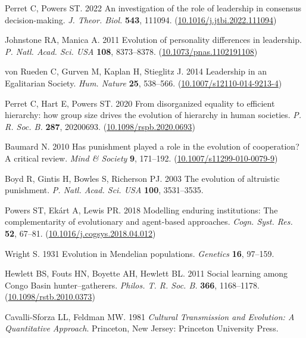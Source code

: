 \documentclass{rstb}
\begin{document}
\begin{thebibliography}{99}
Perret C, Powers ST. 2022  An investigation of the role of leadership in
  consensus decision-making. {\em J. Theor. Biol.} \textbf{543},
  111094.
(\href{http://dx.doi.org/10.1016/j.jtbi.2022.111094}{10.1016/j.jtbi.2022.111094})

Johnstone RA, Manica A. 2011  Evolution of personality differences in
  leadership. {\em P. Natl. Acad. Sci. USA}
  \textbf{108}, 8373--8378.
(\href{http://dx.doi.org/10.1073/pnas.1102191108}{10.1073/pnas.1102191108})

von Rueden C, Gurven M, Kaplan H, Stieglitz J. 2014  Leadership in an
  {Egalitarian} {Society}. {\em Hum. Nature} \textbf{25}, 538--566.
(\href{http://dx.doi.org/10.1007/s12110-014-9213-4}{10.1007/s12110-014-9213-4})

Perret C, Hart E, Powers ST. 2020  From disorganized equality to efficient
  hierarchy: how group size drives the evolution of hierarchy in human
  societies. {\em P. R. Soc. B.}
  \textbf{287}, 20200693.
  (\href{http://dx.doi.org/10.1098/rspb.2020.0693}{10.1098/rspb.2020.0693})

Baumard N. 2010  {Has punishment played a role in the evolution of cooperation?
  A critical review}. {\em Mind \& Society} \textbf{9}, 171--192.
(\href{http://dx.doi.org/10.1007/s11299-010-0079-9}{10.1007/s11299-010-0079-9})

Boyd R, Gintis H, Bowles S, Richerson PJ. 2003  The evolution of altruistic
  punishment. {\em P. Natl. Acad. Sci. USA} \textbf{100}, 3531--3535.

Powers ST, Ekárt A, Lewis PR. 2018  Modelling enduring institutions: {The}
  complementarity of evolutionary and agent-based approaches. {\em Cogn.  Syst. Res.} \textbf{52}, 67--81.
(\href{http://dx.doi.org/10.1016/j.cogsys.2018.04.012}{10.1016/j.cogsys.2018.04.012})

Wright S. 1931  Evolution in {Mendelian} populations. {\em Genetics}
  \textbf{16}, 97--159.

Hewlett BS, Fouts HN, Boyette AH, Hewlett BL. 2011  Social learning among Congo
  Basin hunter--gatherers. {\em Philos. T. R. Soc. B.} \textbf{366}, 1168--1178.
(\href{http://dx.doi.org/10.1098/rstb.2010.0373}{10.1098/rstb.2010.0373})

Cavalli-Sforza LL, Feldman MW. 1981 {\em Cultural Transmission and Evolution: A
  Quantitative Approach}.
Princeton, New Jersey: Princeton University Press.


\end{thebibliography}
\end{document}

